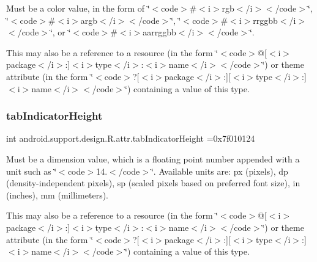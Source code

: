 Must be a color value, in the form of \char`\"{}$<$code$>$\#$<$i$>$rgb$<$/i$>$$<$/code$>$\char`\"{}, \char`\"{}$<$code$>$\#$<$i$>$argb$<$/i$>$$<$/code$>$\char`\"{}, \char`\"{}$<$code$>$\#$<$i$>$rrggbb$<$/i$>$$<$/code$>$\char`\"{}, or \char`\"{}$<$code$>$\#$<$i$>$aarrggbb$<$/i$>$$<$/code$>$\char`\"{}. 

This may also be a reference to a resource (in the form \char`\"{}$<$code$>$@\mbox{[}$<$i$>$package$<$/i$>$\+:\mbox{]}$<$i$>$type$<$/i$>$\+:$<$i$>$name$<$/i$>$$<$/code$>$\char`\"{}) or theme attribute (in the form \char`\"{}$<$code$>$?\mbox{[}$<$i$>$package$<$/i$>$\+:\mbox{]}\mbox{[}$<$i$>$type$<$/i$>$\+:\mbox{]}$<$i$>$name$<$/i$>$$<$/code$>$\char`\"{}) containing a value of this type. \mbox{\label{classandroid_1_1support_1_1design_1_1R_1_1attr_a690f28988df1557974bcfc4bd4e877a9}} 
\subsubsection{\texorpdfstring{tab\+Indicator\+Height}{tabIndicatorHeight}}
{\footnotesize\ttfamily int android.\+support.\+design.\+R.\+attr.\+tab\+Indicator\+Height =0x7f010124\hspace{0.3cm}{\ttfamily [static]}}

Must be a dimension value, which is a floating point number appended with a unit such as \char`\"{}$<$code$>$14.\+5sp$<$/code$>$\char`\"{}. Available units are\+: px (pixels), dp (density-\/independent pixels), sp (scaled pixels based on preferred font size), in (inches), mm (millimeters). 

This may also be a reference to a resource (in the form \char`\"{}$<$code$>$@\mbox{[}$<$i$>$package$<$/i$>$\+:\mbox{]}$<$i$>$type$<$/i$>$\+:$<$i$>$name$<$/i$>$$<$/code$>$\char`\"{}) or theme attribute (in the form \char`\"{}$<$code$>$?\mbox{[}$<$i$>$package$<$/i$>$\+:\mbox{]}\mbox{[}$<$i$>$type$<$/i$>$\+:\mbox{]}$<$i$>$name$<$/i$>$$<$/code$>$\char`\"{}) containing a value of this type. \mbox{\label{classandroid_1_1support_1_1design_1_1R_1_1attr_a650581c154950889e3bd6241f121f180}} 
